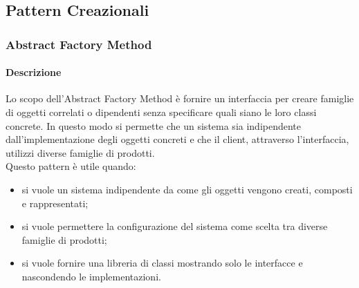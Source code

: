 \newpage
\subsection{Pattern Creazionali}
\subsubsection{Abstract Factory Method}
\paragraph{Descrizione}
Lo scopo dell'Abstract Factory Method è fornire un interfaccia per creare famiglie di oggetti correlati o dipendenti senza specificare quali siano le loro classi concrete.
In questo modo si permette che un sistema sia indipendente dall'implementazione degli oggetti concreti e che il client, attraverso l'interfaccia, utilizzi diverse famiglie di prodotti.
\\Questo pattern è utile quando:
\begin{itemize}
	\item 	si vuole un sistema indipendente da come gli oggetti vengono creati, composti e rappresentati;
	\item 	si vuole permettere la configurazione del sistema come scelta tra diverse famiglie di prodotti;
	\item 	si vuole fornire una libreria di classi mostrando solo le interfacce e nascondendo le implementazioni.
\end{itemize}
